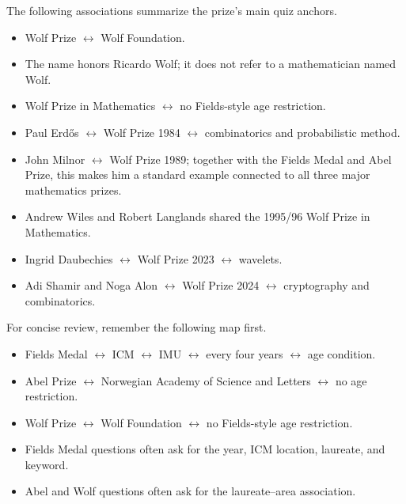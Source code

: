    \begin{fact}
        The following associations summarize the prize's main quiz anchors.
        \begin{itemize}
            \item Wolf Prize $\leftrightarrow$ Wolf Foundation.
            \item The name honors Ricardo Wolf; it does not refer to a
                  mathematician named Wolf.
            \item Wolf Prize in Mathematics $\leftrightarrow$ no Fields-style age restriction.
            \item Paul Erd\H{o}s $\leftrightarrow$ Wolf Prize 1984 $\leftrightarrow$ combinatorics and
            probabilistic method.
            \item John Milnor $\leftrightarrow$ Wolf Prize 1989; together with the Fields Medal and
            Abel Prize, this makes him a standard example connected to all three major mathematics
            prizes.
            \item Andrew Wiles and Robert Langlands shared the 1995/96 Wolf Prize in Mathematics.
            \item Ingrid Daubechies $\leftrightarrow$ Wolf Prize 2023 $\leftrightarrow$ wavelets.
            \item Adi Shamir and Noga Alon $\leftrightarrow$ Wolf Prize 2024 $\leftrightarrow$
            cryptography and combinatorics.
        \end{itemize}
    \end{fact}

    \begin{fact}
        For concise review, remember the following map first.
        \begin{itemize}
            \item Fields Medal $\leftrightarrow$ ICM $\leftrightarrow$ IMU $\leftrightarrow$ every
            four years $\leftrightarrow$ age condition.
            \item Abel Prize $\leftrightarrow$ Norwegian Academy of Science and Letters
            $\leftrightarrow$ no age restriction.
            \item Wolf Prize $\leftrightarrow$ Wolf Foundation $\leftrightarrow$ no Fields-style age
            restriction.
            \item Fields Medal questions often ask for the year, ICM location, laureate, and
            keyword.
            \item Abel and Wolf questions often ask for the laureate--area association.
        \end{itemize}
    \end{fact}

